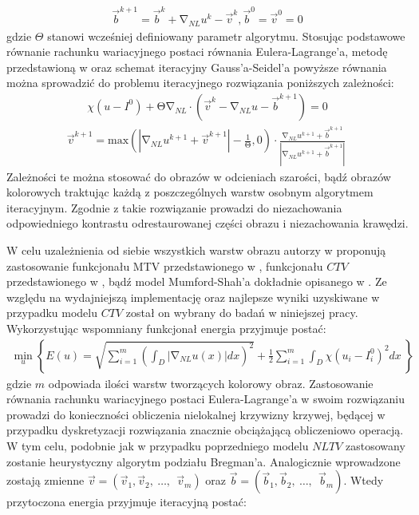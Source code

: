 \documentclass[12pt, twoside, openany]{report}
\theoremstyle{definition}
\begin{document}
\begin{align}
{\overrightarrow{b}}^{k+1}={\overrightarrow{b}}^k+{\mathrm{\nabla }}_{NL}u^k-{\overrightarrow{v}}^k, {\overrightarrow{b}}^0={\overrightarrow{v}}^0=0
\label{BREGMANVARIABLE}
\end{align}
gdzie $\Theta$ stanowi wcześniej definiowany parametr algorytmu. Stosując podstawowe równanie rachunku wariacyjnego postaci równania Eulera-Lagrange’a, metodę przedstawioną w \cite{tai2011fast} oraz schemat iteracyjny Gauss’a-Seidel’a powyższe równania można sprowadzić do problemu iteracyjnego rozwiązania poniższych zależności:
\begin{align}
\chi \left(u-I^0\right)+\mathrm{\Theta }{\mathrm{\nabla }}_{NL}\cdot \left({\overrightarrow{v}}^k-{\mathrm{\nabla }}_{NL}u-{\overrightarrow{b}}^{k+1}\right)=0
\label{ELNLTV1}
\end{align}
\begin{align}
{\overrightarrow{v}}^{k+1}\mathrm{=}{\mathrm{max} \left(\left|{\mathrm{\nabla }}_{NL}u^{k+1}+{\overrightarrow{v}}^{k+1}\right|-\frac{1}{\mathrm{\Theta }},0\right)\cdot\frac{{\mathrm{\nabla }}_{NL}u^{k+1}+{\overrightarrow{b}}^{k+1}}{\left|{\mathrm{\nabla }}_{NL}u^{k+1}+{\overrightarrow{b}}^{k+1}\right|}\ }
\label{ELNLTV2}
\end{align}
Zależności te można stosować do obrazów w odcieniach szarości, bądź obrazów kolorowych traktując każdą z poszczególnych warstw osobnym algorytmem iteracyjnym. Zgodnie z \cite{duan2015fast} takie rozwiązanie prowadzi do niezachowania odpowiedniego kontrastu odrestaurowanej części obrazu i niezachowania krawędzi.
\par
W celu uzależnienia od siebie wszystkich warstw obrazu autorzy w \cite{duan2015fast} proponują zastosowanie funkcjonału MTV przedstawionego w \cite{yang2009fast}, funkcjonału $CTV$ przedstawionego w \cite{blomgren1998color}, bądź model Mumford-Shah’a dokładnie opisanego w \cite{jung2011nonlocal}. Ze względu na wydajniejszą implementację oraz najlepsze wyniki uzyskiwane w przypadku modelu $CTV$ został on wybrany do badań w niniejszej pracy. Wykorzystując wspomniany funkcjonał energia przyjmuje postać:
\begin{align}
{\mathop{\mathrm{min}}_{u} \left\{E\left(u\right)=\sqrt{\sum^m_{i=1}{{\left(\int_D{\left|{\mathrm{\nabla }}_{NL}u(x)\right|}dx\right)}^2}}+\frac{1}{2}\sum^m_{i=1}{\int_D{\chi{\left(u_i-I^0_i\right)}^2}dx}\ \right\}\ }
\label{ENLCTV}
\end{align}
gdzie $m$ odpowiada ilości warstw tworzących kolorowy obraz. Zastosowanie równania rachunku wariacyjnego postaci Eulera-Lagrange’a w swoim rozwiązaniu prowadzi do konieczności obliczenia nielokalnej krzywizny krzywej, będącej w przypadku dyskretyzacji rozwiązania znacznie obciążającą obliczeniowo operacją. W tym celu, podobnie jak w przypadku poprzedniego modelu $NLTV$ zastosowany zostanie heurystyczny algorytm podziału Bregman’a. Analogicznie wprowadzone zostają zmienne $\overrightarrow{v}=\left({\overrightarrow{v}}_1,{\overrightarrow{v}}_2,\ \dots ,\ \ {\overrightarrow{v}}_m\right)$ oraz $\overrightarrow{b}=\left({\overrightarrow{b}}_1,{\overrightarrow{b}}_2,\ \dots ,\ \ {\overrightarrow{b}}_m\right)$. Wtedy przytoczona energia przyjmuje iteracyjną postać: 
\end{document}
